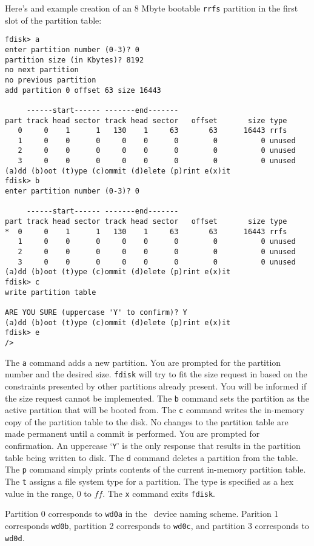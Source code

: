 Here's and example creation of an 8 Mbyte bootable {\tt rrfs} partition
in the first slot of the partition table:

{\small \begin{verbatim}
fdisk> a
enter partition number (0-3)? 0
partition size (in Kbytes)? 8192
no next partition
no previous partition
add partition 0 offset 63 size 16443

     ------start------ -------end-------
part track head sector track head sector   offset       size type
   0     0    1      1   130    1     63       63      16443 rrfs
   1     0    0      0     0    0      0        0          0 unused
   2     0    0      0     0    0      0        0          0 unused
   3     0    0      0     0    0      0        0          0 unused
(a)dd (b)oot (t)ype (c)ommit (d)elete (p)rint e(x)it
fdisk> b
enter partition number (0-3)? 0

     ------start------ -------end-------
part track head sector track head sector   offset       size type
*  0     0    1      1   130    1     63       63      16443 rrfs
   1     0    0      0     0    0      0        0          0 unused
   2     0    0      0     0    0      0        0          0 unused
   3     0    0      0     0    0      0        0          0 unused
(a)dd (b)oot (t)ype (c)ommit (d)elete (p)rint e(x)it
fdisk> c
write partition table

ARE YOU SURE (uppercase 'Y' to confirm)? Y
(a)dd (b)oot (t)ype (c)ommit (d)elete (p)rint e(x)it
fdisk> e
/>
\end{verbatim}}

The {\tt a} command adds a new partition.  You are prompted for the
partition number and the desired size.  {\tt fdisk} will try to fit
the size request in based on the constraints presented by other
partitions already present.  You will be informed if the size request
cannot be implemented.
The {\tt b} command sets the partition as the active partition that
will be booted from.
The {\tt c} command writes the in-memory copy of the partition table
to the disk.  No changes to the partition table are made permanent
until a commit is performed.  You are prompted for confirmation.  An
uppercase `{\tt Y}' is the only response that results in the partition
table being written to disk.
The {\tt d} command deletes a partition from the table.
The {\tt p} command simply prints contents of the current
in-memory partition table.
The {\tt t} assigns a file system type for a partition.  The type
is specified as a hex value in the range, $0$ to $ff$.
The {\tt x} command exits {\tt fdisk}.

Partition 0 corresponds to {\tt wd0a} in the \roadrunner\  device naming
scheme.  Parition 1 corresponds {\tt wd0b}, partition 2 corresponds to
{\tt wd0c}, and partition 3 corresponds to {\tt wd0d}.



